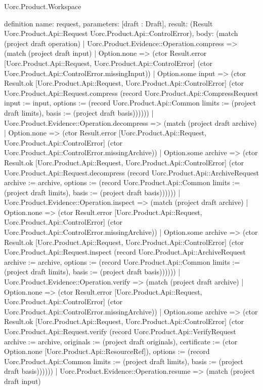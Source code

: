 \begin{lexlean}{Uorc.Product.Workspace}
\begin{semanticmodule}
definition{
  name: request,
  parameters: [draft : Draft],
  result: (Result Uorc.Product.Api::Request Uorc.Product.Api::ControlError),
  body: (match (project draft operation)
    | Uorc.Product.Evidence::Operation.compress => (match (project draft input)
      | Option.none => (ctor Result.error [Uorc.Product.Api::Request, Uorc.Product.Api::ControlError] (ctor Uorc.Product.Api::ControlError.missingInput))
      | Option.some input => (ctor Result.ok [Uorc.Product.Api::Request, Uorc.Product.Api::ControlError] (ctor Uorc.Product.Api::Request.compress (record Uorc.Product.Api::CompressRequest {input := input, options := (record Uorc.Product.Api::Common {limits := (project draft limits), basis := (project draft basis)})}))))
    | Uorc.Product.Evidence::Operation.decompress => (match (project draft archive)
      | Option.none => (ctor Result.error [Uorc.Product.Api::Request, Uorc.Product.Api::ControlError] (ctor Uorc.Product.Api::ControlError.missingArchive))
      | Option.some archive => (ctor Result.ok [Uorc.Product.Api::Request, Uorc.Product.Api::ControlError] (ctor Uorc.Product.Api::Request.decompress (record Uorc.Product.Api::ArchiveRequest {archive := archive, options := (record Uorc.Product.Api::Common {limits := (project draft limits), basis := (project draft basis)})}))))
    | Uorc.Product.Evidence::Operation.inspect => (match (project draft archive)
      | Option.none => (ctor Result.error [Uorc.Product.Api::Request, Uorc.Product.Api::ControlError] (ctor Uorc.Product.Api::ControlError.missingArchive))
      | Option.some archive => (ctor Result.ok [Uorc.Product.Api::Request, Uorc.Product.Api::ControlError] (ctor Uorc.Product.Api::Request.inspect (record Uorc.Product.Api::ArchiveRequest {archive := archive, options := (record Uorc.Product.Api::Common {limits := (project draft limits), basis := (project draft basis)})}))))
    | Uorc.Product.Evidence::Operation.verify => (match (project draft archive)
      | Option.none => (ctor Result.error [Uorc.Product.Api::Request, Uorc.Product.Api::ControlError] (ctor Uorc.Product.Api::ControlError.missingArchive))
      | Option.some archive => (ctor Result.ok [Uorc.Product.Api::Request, Uorc.Product.Api::ControlError] (ctor Uorc.Product.Api::Request.verify (record Uorc.Product.Api::VerifyRequest {archive := archive, originals := (project draft originals), certificate := (ctor Option.none [Uorc.Product.Api::ResourceRef]), options := (record Uorc.Product.Api::Common {limits := (project draft limits), basis := (project draft basis)})}))))
    | Uorc.Product.Evidence::Operation.resume => (match (project draft input)
}
\end{semanticmodule}
\end{lexlean}
